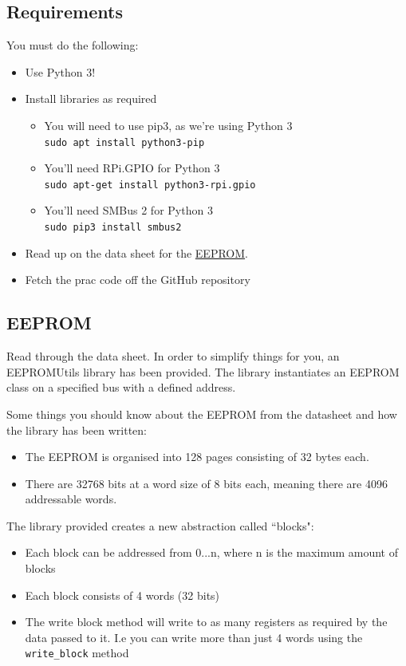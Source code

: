 \subsection{Requirements}
You must do the following:
\begin{itemize}
    \item Use Python 3!
    \item Install libraries as required
    \begin{itemize}
        \item You will need to use pip3, as we're using Python 3\\
        \verb|sudo apt install python3-pip|
        \item You'll need RPi.GPIO for Python 3\\
        \verb|sudo apt-get install python3-rpi.gpio|
        \item You'll need SMBus 2 for Python 3\\
        \verb|sudo pip3 install smbus2|
    \end{itemize}
    \item Read up on the data sheet for the \href{https://datasheet.lcsc.com/szlcsc/Fremont-Micro-Devices-FT24C32A-ETR-T_C232881.pdf}{EEPROM}.
    \item Fetch the prac code off the GitHub repository
\end{itemize}


\subsection{EEPROM}
Read through the data sheet. In order to simplify things for you, an EEPROMUtils library has been provided. The library instantiates an EEPROM class on a specified bus with a defined address. 

Some things you should know about the EEPROM from the datasheet and how the library has been written:
\begin{itemize}
    \item The EEPROM is organised into 128 pages consisting of 32 bytes each.
    \item There are 32768 bits at a word size of 8 bits each, meaning there are 4096 addressable words.
\end{itemize}

The library provided creates a new abstraction called ``blocks":
\begin{itemize}
    \item Each block can be addressed from 0...n, where n is the maximum amount of blocks
    \item Each block consists of 4 words (32 bits)
    \item The write block method will write to as many registers as required by the data passed to it. I.e you can write more than just 4 words using the \verb|write_block| method
\end{itemize}


